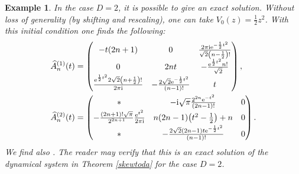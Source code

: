 \documentclass[pdftex]{sigma}
\numberwithin{equation}{section}
\newtheorem{Example}[Theorem]{Example} }
\begin{document}
\begin{Example}\label{exactsolution} In the case $D=2$, it is possible to give an exact solution. Without loss of generality (by shifting and rescaling), one can take $V_0(z) = \frac{1}{2}z^2$. With this initial condition one finds the following:
\begin{align*}
\widehat{A}_{n}^{(1)}(t) &= \left( \begin{matrix}
-t (2n+1) & 0 & \frac{2\pi {\rm i} {\rm e}^{-\frac{1}{2}t^2}}{\sqrt{2}\left( n-\frac{1}{2} \right)!} \\[1mm]
0 & 2nt & - \frac{{\rm e}^{\frac{1}{2}t^2}n!}{\sqrt{2}} \\[1mm]
 \frac{{\rm e}^{\frac{1}{2}t^2} 2 \sqrt{2} \left( n + \frac{1}{2} \right)!}{2\pi {\rm i} } &- \frac{2\sqrt{2} {\rm e}^{-\frac{1}{2}t^2}}{(n-1)!} & t\end{matrix} \right), \\
\widehat{A}_{n}^{(2)}(t) &= \left( \begin{matrix}
 \ast & - {\rm i} \sqrt{\pi} \frac{2^{2n} {\rm e}^{-t^2}}{(2n-1)!} & 0 \\[1mm]
 -\frac{(2n+1)! \sqrt{\pi}}{2^{2n+1}} \frac{{\rm e}^{t^2}}{2\pi {\rm i}} & n(2n-1)\big(t^2 - \frac{1}{2}\big)+n & 0 \\[1mm]
\ast & - \frac{2\sqrt{2}(2n-1) t {\rm e}^{-\frac{1}{2}t^2}}{(n-1)!} & 0 \end{matrix} \right).
\end{align*}
We find also . The reader may verify that this is an exact solution of the dynamical system in Theorem \ref{skewtoda} for the case $D=2$.
\end{Example}
\end{document}
